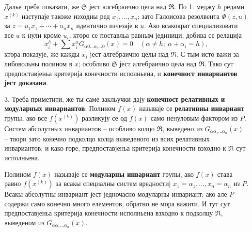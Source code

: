 ﻿\documentclass[11pt]{article}
\begin{document}
Далье треба показати, же $\mathfrak S$ јест алгебраично цела над $\mathfrak R$. По 1. меджу $h$ редами $x^{(k)}$ наступаје такоже изходны ред $x_1,\ldots,x_n$; зато Галоисова резолвента $\Phi(z,u)$ за $z=u_1x_1+\cdots+u_nx_n$ идентично изчезаје в $u$. Ако всакократ специализовати все $u$ к нули кроме $u_i$, кторо се поставльа равным јединици, добива се релација
\[
 x_i^h+\sum x_i^\alpha G_{\alpha0\ldots\alpha_i\ldots0}(x)=0
 \quad (\alpha\ne h;\ \alpha+\alpha_i=h),
\]
ктора показује, же кажды $x_i$ јест алгебраично целы над $\mathfrak R$. С тым исто важи за либовольны полином в $x$; особливо $\mathfrak S$ јест алгебраично цела над $\mathfrak R$. Тако сут предпоставјеньа критерија конечности исполньена, и \textbf{конечност инвариантов јест доказана}.

3. Треба приметити, же ты саме закльучки дају \textbf{конечност релативных и модуларных инвариантов}. Полином $f(x)$ называје се \textbf{релативны инвариант} групы, ако все $f(x^{(k)})$ разликују се од $f(x)$ само ненуловым фактором из $P$. Систем абсолутных инвариантов -- особливо колцо $\mathfrak R$, выведено из $G_{\alpha\alpha_1\ldots\alpha_n}(x)$ -- твори зато конечно подколцо колца выведеного из всих релативных инвариантов; и како горе, предпоставјеньа критерија конечности взходно к $\mathfrak R$ сут исполньена.

Полином $f(x)$ называје се \textbf{модуларны инвариант} групы, ако $f(x)$ става равно $f(x^{(k)})$ за всакы специалны систем вредностиј $x_1=\alpha_1,\ldots,x_n=\alpha_n$ из $P$. Всакы абсолутны инвариант јест једночасно модуларны инвариант; ако але $P$ содержи само конечно много елементов, обратно не мора важити. И тут сут предпоставјеньа критерија конечности исполньена взходно к подколцу $\mathfrak R$, выведеном из $G_{\alpha\alpha_1\ldots\alpha_n}(x)$.

\clearpage
\end{document}
